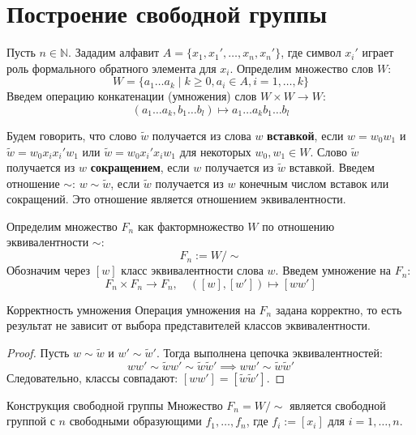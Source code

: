 
\section{Построение свободной группы}

Пусть $n \in \mathbb{N}$.
Зададим алфавит $A = \{x_1, x_1', \dots, x_n, x_n'\}$, где символ $x_i'$ играет роль формального обратного элемента для $x_i$.
Определим множество слов $W$:
\[ W = \{a_1 \dots a_k \mid k \ge 0, a_i \in A, i = 1, \dots, k\} \]
Введем операцию конкатенации (умножения) слов $W \times W \to W$:
\[ (a_1 \dots a_k, b_1 \dots b_l) \mapsto a_1 \dots a_k b_1 \dots b_l \]

Будем говорить, что слово $\widetilde{w}$ получается из слова $w$ \textbf{вставкой}, если $w = w_0 w_1$ и $\widetilde{w} = w_0 x_i x_i' w_1$ или $\widetilde{w} = w_0 x_i' x_i w_1$ для некоторых $w_0, w_1 \in W$.
Слово $\widetilde{w}$ получается из $w$ \textbf{сокращением}, если $w$ получается из $\widetilde{w}$ вставкой.
Введем отношение $\sim$: $w \sim \widetilde{w}$, если $\widetilde{w}$ получается из $w$ конечным числом вставок или сокращений.
Это отношение является отношением эквивалентности.

Определим множество $F_n$ как фактормножество $W$ по отношению эквивалентности $\sim$:
\[ F_n := W / \sim \]
Обозначим через $[w]$ класс эквивалентности слова $w$.
Введем умножение на $F_n$:
\[ F_n \times F_n \to F_n, \quad ([w], [w']) \mapsto [ww'] \]

\begin{Lemma}{Корректность умножения}{}
	Операция умножения на $F_n$ задана корректно, то есть результат не зависит от выбора представителей классов эквивалентности.
\end{Lemma}

\begin{proof}
	Пусть $w \sim \widetilde{w}$ и $w' \sim \widetilde{w}'$. Тогда выполнена цепочка эквивалентностей:
	\[ ww' \sim \widetilde{w}w' \sim \widetilde{w}\widetilde{w}' \implies ww' \sim \widetilde{w}\widetilde{w}' \]
	Следовательно, классы совпадают: $[ww'] = [\widetilde{w}\widetilde{w}']$.
\end{proof}

\begin{Theorem}{Конструкция свободной группы}{}
	Множество $F_n = W / \sim$ является свободной группой с $n$ свободными образующими $f_1, \dots, f_n$, где $f_i := [x_i]$ для $i = 1, \dots, n$.
\end{Theorem}

